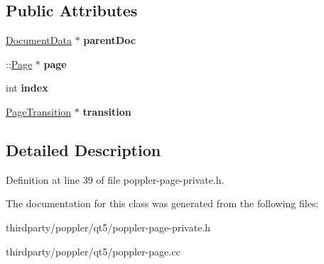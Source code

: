 \subsection*{Public Attributes}
\begin{DoxyCompactItemize}
\item 
\mbox{\label{class_poppler_1_1_page_data_ae1f7e9d53f7ead9bbfd8b1b8fa421e1c}} 
\hyperlink{class_poppler_1_1_document_data}{Document\+Data} $\ast$ {\bfseries parent\+Doc}
\item 
\mbox{\label{class_poppler_1_1_page_data_a80b90f62382d6357d4003bd3f29ea69c}} 
\+::\hyperlink{class_poppler_1_1_page}{Page} $\ast$ {\bfseries page}
\item 
\mbox{\label{class_poppler_1_1_page_data_ac0ce5cfc2b9ac56aaa5bdd4a579518ee}} 
int {\bfseries index}
\item 
\mbox{\label{class_poppler_1_1_page_data_a23aaf20526b7d94bce189966854072bd}} 
\hyperlink{class_poppler_1_1_page_transition}{Page\+Transition} $\ast$ {\bfseries transition}
\end{DoxyCompactItemize}


\subsection{Detailed Description}


Definition at line 39 of file poppler-\/page-\/private.\+h.



The documentation for this class was generated from the following files\+:\begin{DoxyCompactItemize}
\item 
thirdparty/poppler/qt5/poppler-\/page-\/private.\+h\item 
thirdparty/poppler/qt5/poppler-\/page.\+cc\end{DoxyCompactItemize}
